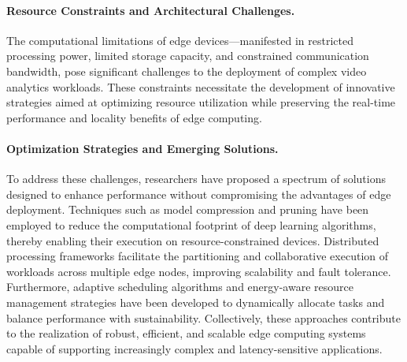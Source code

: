 \paragraph{Resource Constraints and Architectural Challenges.}
The computational limitations of edge devices—manifested in restricted processing power, limited storage capacity, and constrained communication bandwidth, pose significant challenges to the deployment of complex video analytics workloads. These constraints necessitate the development of innovative strategies aimed at optimizing resource utilization while preserving the real-time performance and locality benefits of edge computing.

\paragraph{Optimization Strategies and Emerging Solutions.}
To address these challenges, researchers have proposed a spectrum of solutions designed to enhance performance without compromising the advantages of edge deployment. Techniques such as model compression and pruning have been employed to reduce the computational footprint of deep learning algorithms, thereby enabling their execution on resource-constrained devices. Distributed processing frameworks facilitate the partitioning and collaborative execution of workloads across multiple edge nodes, improving scalability and fault tolerance. Furthermore, adaptive scheduling algorithms and energy-aware resource management strategies have been developed to dynamically allocate tasks and balance performance with sustainability. Collectively, these approaches contribute to the realization of robust, efficient, and scalable edge computing systems capable of supporting increasingly complex and latency-sensitive applications.